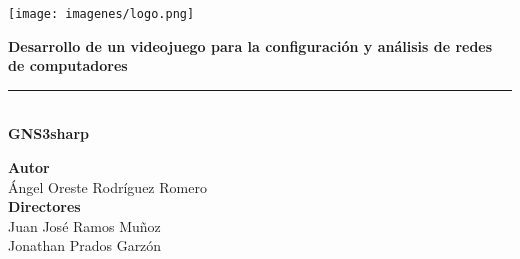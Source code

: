 \begin{titlepage}
 
 
\setlength{\centeroffset}{-0.5\oddsidemargin}
\addtolength{\centeroffset}{0.5\evensidemargin}
\thispagestyle{empty}

\noindent\hspace*{\centeroffset}\begin{minipage}{\textwidth}

\centering



 \vspace{3.3cm}

\texttt{[image: imagenes/logo.png]} 
 \vspace{0.5cm}


{\Huge\bfseries Desarrollo de un videojuego para la configuración y análisis de redes de computadores\\
}
\noindent\rule[-1ex]{\textwidth}{3pt}\\[3.5ex]
{\large\bfseries GNS3sharp\\[4cm]}
\end{minipage}

\vspace{2.5cm}
\noindent\hspace*{\centeroffset}\begin{minipage}{\textwidth}
\centering

\textbf{Autor}\\ {Ángel Oreste Rodríguez Romero}\\[2.5ex]
\textbf{Directores}\\
{Juan José Ramos Muñoz\\
Jonathan Prados Garzón}\\[2cm]
\end{minipage}

 
\end{titlepage}


